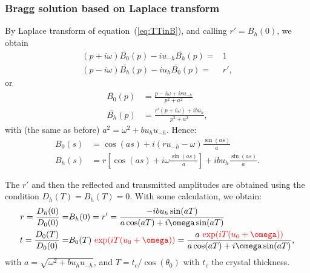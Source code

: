 \documentclass[preprint]{iucr}              %
\newcommand{\inred}[1]{{\color{red}#1}}
\begin{document}
\subsubsection{Bragg solution based on Laplace transform}By Laplace transform of equation~(\ref{eq:TTinB}), and calling \inred{$r'=B_h(0)$}, we obtain
\begin{subequations}
\label{eq:TTbraggLaplace}
\begin{align}
(p + i \omega) \bar{B_0}(p) - i u_{-h} \bar{B_h}(p)= & 1 \\
(p - i \omega) \bar{B_h}(p) - i u_{h} \bar{B_0}(p)= & r',
\end{align}
\end{subequations}
or 
\begin{subequations}
\begin{align}
\bar{B_0}(p) &= \frac{p - i \omega + i r u_{-h}}{p^2 + a^2} \\
\bar{B_h}(p) &= \frac{r' (p + i \omega) + i b u_h}{p^2 + a^2},
\end{align}
\end{subequations}
with \inred{(the same as before)} $a^2=\omega^2+b u_h u_{-h}$. Hence:
\begin{subequations}
\begin{align}
B_0(s) &= \cos(a s) + i (r u_{-h} - \omega) \frac{\sin(a s)}{a}\\
B_h(s) &= r [\cos(a s) + i \omega \frac{\sin(a s)}{a}] + i b u_h \frac{\sin(a s)}{a}.
\end{align}
\end{subequations}

The $r'$ and then the reflected and transmitted amplitudes are obtained using the condition $D_h(T)=B_h(T)=0$. With some calculation, we obtain: 
\begin{subequations}
\begin{align}
r=\frac{D_h(0)}{D_0(0)} =& B_h(0) = r' = \frac{-i b u_h \sin(a T)}{a \cos(a T) + i\omega \sin(a T)}\\
t =\frac{D_0(T)}{D_0(0)}= & B_0(T) ~ \inred{\exp(i T (u_0+\omega))} = \frac{a~\inred{\exp(i T (u_0+\omega))}}{a \cos(a T) + i\omega \sin(a T)} ,
\end{align}
\end{subequations}
with $a=\sqrt{\omega^2 + b u_h u_{-h}}$, and  
\inred{$T=t_c/\cos(\theta_0)$ with $t_c$ the crystal thickness. }


\end{document}
